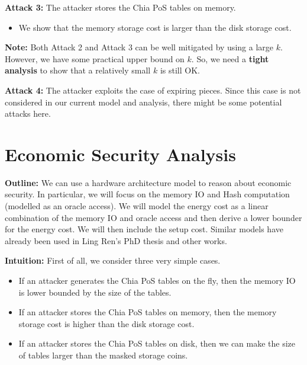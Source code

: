\documentclass[12pt,draftcls,onecolumn]{IEEEtran}
\begin{document}
{\bf Attack 3:} The attacker stores the Chia PoS tables on memory.

\begin{itemize}
    \item We show that the memory storage cost is larger than the disk storage cost.
\end{itemize}

{\bf Note:} Both Attack 2 and Attack 3 can be well mitigated by using a large $k$. However, we have some practical upper bound on $k$. So, we need a {\bf tight analysis} to show that a relatively small $k$ is still OK.

{\bf Attack 4:} The attacker exploits the case of expiring pieces. Since this case is not considered in our current model and analysis, there might be some potential attacks here.



\section{Economic Security Analysis}


{\bf Outline:} We can use a hardware architecture model to reason about economic security. In particular, we will focus on the memory IO and Hash computation (modelled as an oracle access). We will model the energy cost as a linear combination of the memory IO and oracle access and then derive a lower bounder for the energy cost. We will then include the setup cost. Similar models have already been used in Ling Ren's PhD thesis and other works.



{\bf Intuition:} First of all, we consider three very simple cases.
\begin{itemize}
    \item If an attacker generates the Chia PoS tables on the fly, then the memory IO is lower bounded by the size of the tables.
    \item If an attacker stores the Chia PoS tables on memory, then the memory storage cost is higher than the disk storage cost.
    \item If an attacker stores the Chia PoS tables on disk, then we can make the size of tables larger than the masked storage coins.
\end{itemize}
\end{document}
